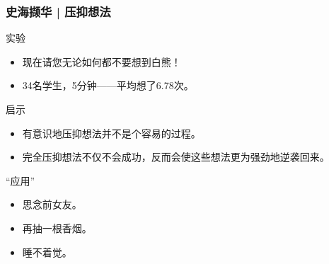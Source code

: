 \begin{frame}
  \frametitle{史海撷华 | 压抑想法}
  \begin{block}{实验}
    \begin{itemize}
      \item 现在请您无论如何都不要想到白熊！
      \item 34名学生，5分钟——平均想了6.78次。
    \end{itemize}
  \end{block}
  \pause
  \begin{block}{启示}
    \begin{itemize}
      \item 有意识地压抑想法并不是个容易的过程。
      \item 完全压抑想法不仅不会成功，反而会使这些想法更为强劲地逆袭回来。
    \end{itemize}
  \end{block}
  \pause
  \begin{block}{“应用”}
    \begin{itemize}
      \item 思念前女友。
      \item 再抽一根香烟。
      \item 睡不着觉。
    \end{itemize}
  \end{block}
\end{frame}


